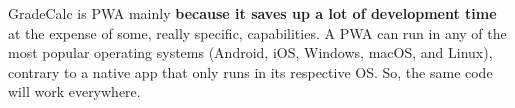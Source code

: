 


GradeCalc is PWA mainly \textbf{because it saves up a lot of development time} at the expense of some, really specific, capabilities. A PWA can run in any of the most popular operating systems (Android, iOS, Windows, macOS, and Linux), contrary to a native app that only runs in its respective OS. So, the same code will work everywhere.



